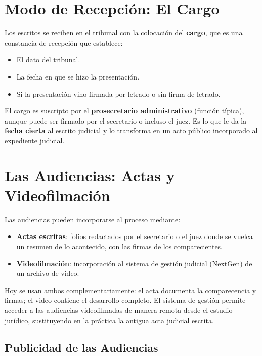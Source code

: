 \documentclass[12pt,oneside]{book}
\begin{document}
\section{Modo de Recepción: El Cargo}

Los escritos se reciben en el tribunal con la colocación del \textbf{cargo}, que es una constancia de recepción que establece:

\begin{itemize}
    \item El dato del tribunal.
    \item La fecha en que se hizo la presentación.
    \item Si la presentación vino firmada por letrado o sin firma de letrado.
\end{itemize}

El cargo es suscripto por el \textbf{prosecretario administrativo} (función típica), aunque puede ser firmado por el secretario o incluso el juez. Es lo que le da la \textbf{fecha cierta} al escrito judicial y lo transforma en un acto público incorporado al expediente judicial.

\section{Las Audiencias: Actas y Videofilmación}

Las audiencias pueden incorporarse al proceso mediante:

\begin{itemize}
    \item \textbf{Actas escritas}: folios redactados por el secretario o el juez donde se vuelca un resumen de lo acontecido, con las firmas de los comparecientes.
    \item \textbf{Videofilmación}: incorporación al sistema de gestión judicial (NextGen) de un archivo de video.
\end{itemize}

Hoy se usan ambos complementariamente: el acta documenta la comparecencia y firmas; el video contiene el desarrollo completo. El sistema de gestión permite acceder a las audiencias videofilmadas de manera remota desde el estudio jurídico, sustituyendo en la práctica la antigua acta judicial escrita.

\subsection{Publicidad de las Audiencias}
\end{document}
